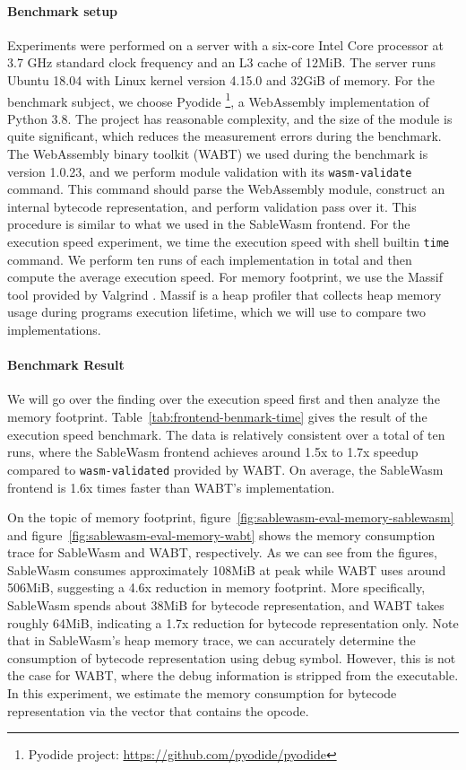 \paragraph{Benchmark setup}
Experiments were performed on a server with a six-core Intel Core processor at 3.7 GHz standard clock frequency and an L3 cache of 12MiB. The server runs Ubuntu 18.04 with Linux kernel version 4.15.0 and 32GiB of memory. For the benchmark subject, we choose Pyodide \footnote{Pyodide project: \url{https://github.com/pyodide/pyodide}}, a WebAssembly implementation of Python 3.8. The project has reasonable complexity, and the size of the module is quite significant, which reduces the measurement errors during the benchmark. The WebAssembly binary toolkit (WABT) we used during the benchmark is version 1.0.23, and we perform module validation with its \texttt{wasm-validate} command. This command should parse the WebAssembly module, construct an internal bytecode representation, and perform validation pass over it. This procedure is similar to what we used in the SableWasm frontend. For the execution speed experiment, we time the execution speed with shell builtin \texttt{time} command. We perform ten runs of each implementation in total and then compute the average execution speed. For memory footprint, we use the Massif tool provided by Valgrind \cite{valgrind-paper}. Massif is a heap profiler that collects heap memory usage during programs execution lifetime, which we will use to compare two implementations. 

\paragraph{Benchmark Result}
We will go over the finding over the execution speed first and then analyze the memory footprint. Table~\ref{tab:frontend-benmark-time} gives the result of the execution speed benchmark. The data is relatively consistent over a total of ten runs, where the SableWasm frontend achieves around 1.5x to 1.7x speedup compared to \texttt{wasm-validated} provided by WABT. On average, the SableWasm frontend is 1.6x times faster than WABT's implementation.



On the topic of memory footprint, figure~\ref{fig:sablewasm-eval-memory-sablewasm} and figure~\ref{fig:sablewasm-eval-memory-wabt} shows the memory consumption trace for SableWasm and WABT, respectively. As we can see from the figures, SableWasm consumes approximately 108MiB at peak while WABT uses around 506MiB, suggesting a 4.6x reduction in memory footprint. More specifically, SableWasm spends about 38MiB for bytecode representation, and WABT takes roughly 64MiB, indicating a 1.7x reduction for bytecode representation only. Note that in SableWasm's heap memory trace, we can accurately determine the consumption of bytecode representation using debug symbol. However, this is not the case for WABT, where the debug information is stripped from the executable. In this experiment, we estimate the memory consumption for bytecode representation via the vector that contains the opcode.

